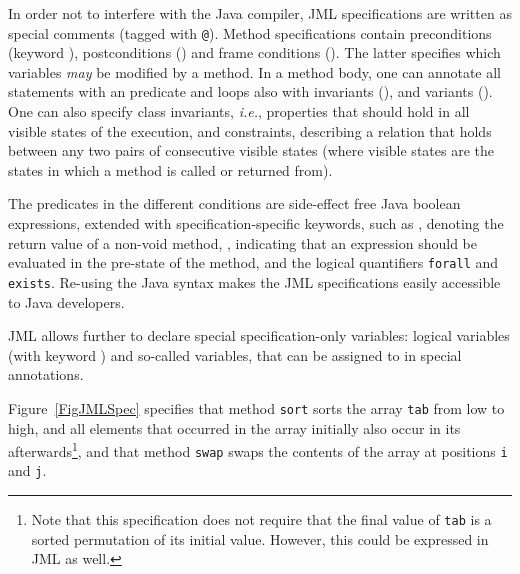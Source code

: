 In order not to interfere with the Java compiler, JML
specifications are written as special comments (tagged with
\texttt{@}). Method specifications contain preconditions (keyword
), postconditions () and frame
conditions (). The latter specifies which variables
\emph{may} be modified by a method. In a method body, one can
annotate all statements with an  predicate and loops
also with invariants (), and variants
(). One can also specify class invariants,
\emph{i.e.}, properties that should hold in all visible states of the
execution, and constraints, describing a relation that 
holds between any two pairs of consecutive visible states (where
visible states are the states in which a method is called or returned
from).

The predicates in the different conditions are side-effect free Java
boolean expressions, extended with specification-specific keywords,
such as , denoting the return value of a non-void
method, , indicating that an expression should be
evaluated in the pre-state of the method, and the logical quantifiers
\texttt{\bsl forall} and \texttt{\bsl exists}. Re-using the Java syntax
makes the JML specifications easily accessible to Java developers.

JML allows further to declare special specification-only variables:
logical variables (with keyword ) and so-called
 variables, that can be assigned to in special
 annotations.

Figure~\ref{FigJMLSpec} specifies that method \texttt{sort} sorts the
array \texttt{tab} from low to high, and all elements that occurred in
the array initially also occur in its afterwards\footnote{Note that
this specification does not require that the final value of
\texttt{tab} is a sorted permutation of its initial value. However, this
could be expressed in JML as well.}, and that method
\texttt{swap} swaps the contents of the array at positions \texttt{i}
and \texttt{j}. 

